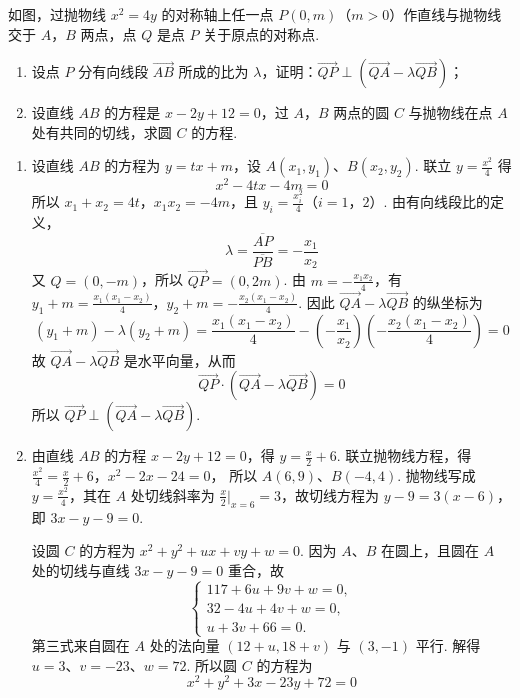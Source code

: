 \begin{problem}
如图，过抛物线 \(x^{2}=4y\) 的对称轴上任一点 \(P(0,m)\)（\(m>0\)）作直线与抛物线交于 \(A\)，\(B\) 两点，点 \(Q\) 是点 \(P\) 关于原点的对称点.

\begin{enumerate}
\item 设点 \(P\) 分有向线段 \(\overrightarrow{AB}\) 所成的比为 \(\lambda\)，证明：\(\overrightarrow{QP}\perp(\overrightarrow{QA}-\lambda\overrightarrow{QB})\)；
\item 设直线 \(AB\) 的方程是 \(x-2y+12=0\)，过 \(A\)，\(B\) 两点的圆 \(C\) 与抛物线在点 \(A\) 处有共同的切线，求圆 \(C\) 的方程.
\end{enumerate}

\end{problem}

\begin{solution}
\begin{enumerate}
\item 设直线 \(AB\) 的方程为 \(y=tx+m\)，设 \(A(x_1,y_1)\)、\(B(x_2,y_2)\). 联立 \(y=\frac{x^2}{4}\) 得
\[
x^2-4tx-4m=0
\]
所以 \(x_1+x_2=4t\)，\(x_1x_2=-4m\)，且 \(y_i=\frac{x_i^2}{4}\)（\(i=1\)，\(2\)）.
由有向线段比的定义，
\[
\lambda=\frac{\overline{AP}}{\overline{PB}}=-\frac{x_1}{x_2}
\]
又 \(Q=(0,-m)\)，所以 \(\overrightarrow{QP}=(0,2m)\). 由 \(m=-\frac{x_1x_2}{4}\)，有
\(y_1+m=\frac{x_1(x_1-x_2)}{4}\)，\(y_2+m=-\frac{x_2(x_1-x_2)}{4}\).
因此 \(\overrightarrow{QA}-\lambda\overrightarrow{QB}\) 的纵坐标为
\[
(y_1+m)-\lambda(y_2+m)=\frac{x_1(x_1-x_2)}{4}-\left(-\frac{x_1}{x_2}\right)\left(-\frac{x_2(x_1-x_2)}{4}\right)=0
\]
故 \(\overrightarrow{QA}-\lambda\overrightarrow{QB}\) 是水平向量，从而
\[
\overrightarrow{QP}\cdot\left(\overrightarrow{QA}-\lambda\overrightarrow{QB}\right)=0
\]
所以 \(\overrightarrow{QP}\perp\left(\overrightarrow{QA}-\lambda\overrightarrow{QB}\right)\).
\item 由直线 \(AB\) 的方程 \(x-2y+12=0\)，得 \(y=\frac{x}{2}+6\). 联立抛物线方程，得
\(\frac{x^2}{4}=\frac{x}{2}+6\)，\(x^2-2x-24=0\)，
所以 \(A(6,9)\)、\(B(-4,4)\). 抛物线写成 \(y=\frac{x^2}{4}\)，其在 \(A\) 处切线斜率为 \(\frac{x}{2}\big|_{x=6}=3\)，故切线方程为 \(y-9=3(x-6)\)，即 \(3x-y-9=0\).

设圆 \(C\) 的方程为 \(x^2+y^2+ux+vy+w=0\). 因为 \(A\)、\(B\) 在圆上，且圆在 \(A\) 处的切线与直线 \(3x-y-9=0\) 重合，故
\[
\begin{cases}
117+6u+9v+w=0,\\
32-4u+4v+w=0,\\
u+3v+66=0.
\end{cases}
\]
第三式来自圆在 \(A\) 处的法向量 \((12+u,18+v)\) 与 \((3,-1)\) 平行. 解得 \(u=3\)、\(v=-23\)、\(w=72\). 所以圆 \(C\) 的方程为
\[
x^2+y^2+3x-23y+72=0
\]
\end{enumerate}
\end{solution}

